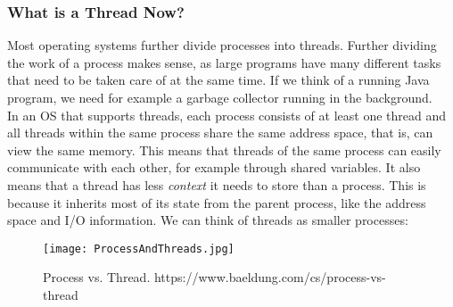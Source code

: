 \documentclass[main]{subfiles}
\begin{document}
\subsubsection{What is a Thread Now?}
Most operating systems further divide processes into threads. Further dividing the work of a process makes sense, as large programs have many different tasks that need to be taken care of at the same time. If we think of a running Java program, we need for example a garbage collector running in the background. \\[3mm]
In an OS that supports threads, each process consists of at least one thread and all threads within the same process share the same address space, that is, can view the same memory. This means that threads of the same process can easily communicate with each other, for example through shared variables. It also means that a thread has less \textit{context} it needs to store than a process. This is because it inherits most of its state from the parent process, like the address space and I/O information. We can think of threads as smaller processes:
\begin{figure}[H]
    \centering
    \texttt{[image: ProcessAndThreads.jpg]}
    \caption{Process vs. Thread. https://www.baeldung.com/cs/process-vs-thread}
\end{figure}
\end{document}
